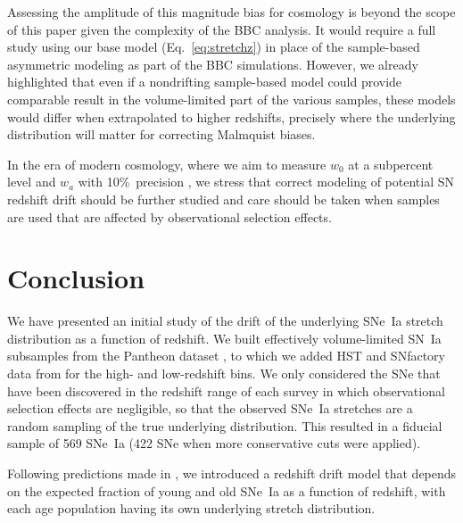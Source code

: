 \documentclass[]{aa}
\begin{document}
Assessing the amplitude of this magnitude bias for cosmology is beyond the scope
of this paper given the complexity of the BBC analysis. It would require a full
study using our base model (Eq.~\ref{eq:stretchz}) in place of the sample-based
asymmetric modeling as part of the BBC simulations. However, we already
highlighted that even if a nondrifting sample-based model could provide
comparable result in the volume-limited part of the various samples, these
models would differ when extrapolated to higher redshifts, precisely where the
underlying distribution will matter for correcting Malmquist biases.

In the era of modern cosmology, where we aim to measure $w_0$ at a subpercent
level and $w_a$ with 10\%\ precision \citep[e.g.,][]{lsstpaper}, we stress that
correct modeling of potential SN redshift drift should be further studied and
care should be taken when samples are used that are affected by observational
selection effects.

\section{Conclusion}\label{sec:ccl}

We have presented an initial study of the drift of the underlying SNe~Ia stretch
distribution as a function of redshift. We built effectively volume-limited
SN~Ia subsamples from the Pantheon dataset \citep[][SDSS, PS1, and
SNLS]{scolnic2018a}, to which we added HST and SNfactory data from
\cite{rigault2020} for the high- and low-redshift bins. We only considered the
SNe that have been discovered in the redshift range of each survey in which
observational selection effects are negligible, so that the observed SNe~Ia
stretches are a random sampling of the true underlying distribution. This
resulted in a fiducial sample of 569 SNe~Ia (422 SNe when more conservative cuts
were applied).

Following predictions made in \cite{rigault2020}, we introduced a redshift drift
model that depends on the expected fraction of young and old SNe~Ia as a
function of redshift, with each age population having its own underlying stretch
distribution.
\end{document}
